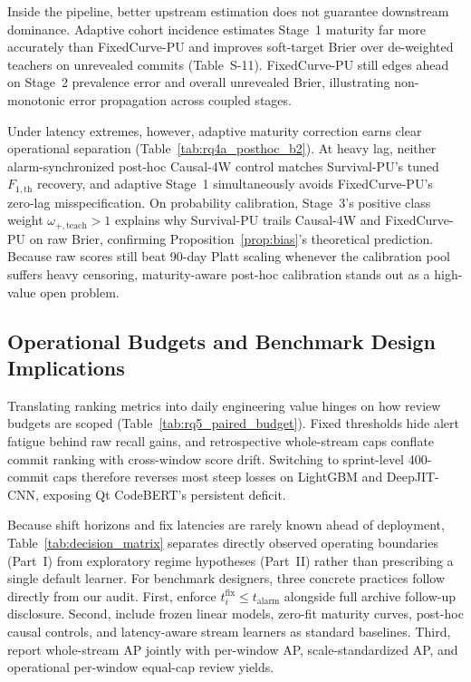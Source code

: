 \documentclass[pdflatex,sn-basic]{sn-jnl}
\theoremstyle{definition}
\theoremstyle{plain}
\begin{document}
Inside the pipeline, better upstream estimation does not guarantee downstream dominance. Adaptive cohort incidence estimates Stage~1 maturity far more accurately than FixedCurve-PU and improves soft-target Brier over de-weighted teachers on unrevealed commits (Table~S-11). FixedCurve-PU still edges ahead on Stage~2 prevalence error and overall unrevealed Brier, illustrating non-monotonic error propagation across coupled stages.

Under latency extremes, however, adaptive maturity correction earns clear operational separation (Table~\ref{tab:rq4a_posthoc_b2}). At heavy lag, neither alarm-synchronized post-hoc Causal-4W control matches Survival-PU's tuned $F_{1,\text{th}}$ recovery, and adaptive Stage~1 simultaneously avoids FixedCurve-PU's zero-lag misspecification. On probability calibration, Stage~3's positive class weight $\omega_{+,\text{teach}} > 1$ explains why Survival-PU trails Causal-4W and FixedCurve-PU on raw Brier, confirming Proposition~\ref{prop:bias}'s theoretical prediction. Because raw scores still beat 90-day Platt scaling whenever the calibration pool suffers heavy censoring, maturity-aware post-hoc calibration stands out as a high-value open problem.

\subsection{Operational Budgets and Benchmark Design Implications}
\label{sec:disc_implications}

Translating ranking metrics into daily engineering value hinges on how review budgets are scoped (Table~\ref{tab:rq5_paired_budget}). Fixed thresholds hide alert fatigue behind raw recall gains, and retrospective whole-stream caps conflate commit ranking with cross-window score drift. Switching to sprint-level 400-commit caps therefore reverses most steep losses on LightGBM and DeepJIT-CNN, exposing Qt CodeBERT's persistent deficit.

Because shift horizons and fix latencies are rarely known ahead of deployment, Table~\ref{tab:decision_matrix} separates directly observed operating boundaries (Part~I) from exploratory regime hypotheses (Part~II) rather than prescribing a single default learner. For benchmark designers, three concrete practices follow directly from our audit. First, enforce $t_i^{\text{fix}} \le t_{\text{alarm}}$ alongside full archive follow-up disclosure. Second, include frozen linear models, zero-fit maturity curves, post-hoc causal controls, and latency-aware stream learners \citep{cabral2019class,cabral2023borb,song2022odasc} as standard baselines. Third, report whole-stream AP jointly with per-window AP, scale-standardized AP, and operational per-window equal-cap review yields.
\end{document}
